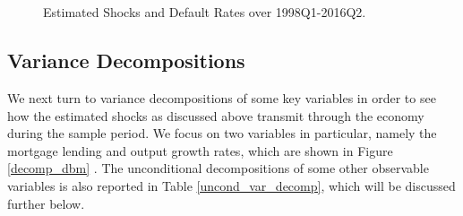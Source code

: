 \documentclass[12pt]{article}
\numberwithin{equation}{section}
\begin{document}
\begin{figure}[H]
\centering
\caption{Estimated Shocks and Default Rates over 1998Q1-2016Q2.}
\label{estimated_shocks4}
\\
\\
\end{figure}


\FloatBarrier

\subsection{Variance Decompositions}

We next turn to variance decompositions of some key variables in order to see how the estimated shocks as discussed above transmit through the economy during the sample period. We focus on two variables in particular, namely the mortgage lending and output growth rates, which are shown in Figure \ref{decomp_dbm} . The unconditional decompositions of some other observable variables is also reported in Table \ref{uncond_var_decomp}, which will be discussed further below. 
\end{document}
